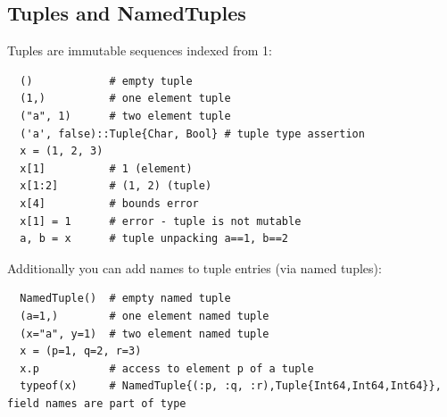 \documentclass[10pt,a4paper]{article}
\begin{document}
\subsection{Tuples and NamedTuples}
Tuples are immutable sequences indexed from 1:
\begin{lstlisting}
  ()            # empty tuple
  (1,)          # one element tuple
  ("a", 1)      # two element tuple
  ('a', false)::Tuple{Char, Bool} # tuple type assertion
  x = (1, 2, 3)
  x[1]          # 1 (element)
  x[1:2]        # (1, 2) (tuple)
  x[4]          # bounds error
  x[1] = 1      # error - tuple is not mutable
  a, b = x      # tuple unpacking a==1, b==2
\end{lstlisting}
Additionally you can add names to tuple entries (via named tuples):
\begin{lstlisting}
  NamedTuple()  # empty named tuple
  (a=1,)        # one element named tuple
  (x="a", y=1)  # two element named tuple
  x = (p=1, q=2, r=3)
  x.p           # access to element p of a tuple
  typeof(x)     # NamedTuple{(:p, :q, :r),Tuple{Int64,Int64,Int64}}, field names are part of type
\end{lstlisting}
\end{document}
